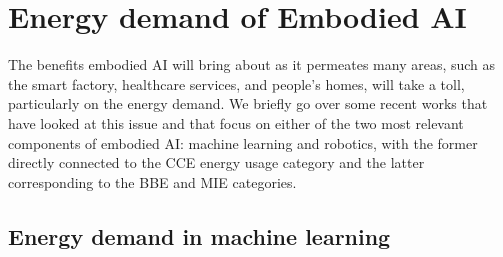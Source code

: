 \section{Energy demand of Embodied AI}\label{sec:energy_demand_embodied_ai}
The benefits embodied AI will bring about as it permeates many areas, such as the smart factory, healthcare services, and people's homes, will take a toll, particularly on the energy demand. We briefly go over some recent works that have looked at this issue and that focus on either of the two most relevant components of embodied AI: machine learning and robotics, with the former directly connected to the CCE energy usage category and the latter corresponding to the BBE and MIE categories.

\subsection{Energy demand in machine learning}


